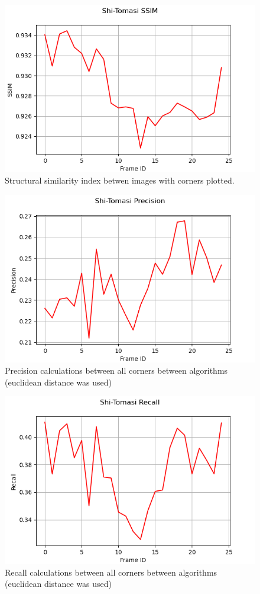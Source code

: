 \documentclass[11pt, conference, letterpaper]{IEEEtran}
\begin{document}
\begin{figure}[t]
    \centering
    \includegraphics[width=0.9\linewidth]{images/stc_ssim.png}
    \caption{Structural similarity index betwen images with corners plotted.}
    \label{fig:stc-ssim}
\end{figure}

\begin{figure}[t]
    \centering
    \includegraphics[width=0.9\linewidth]{images/stc_precision.png}
    \caption{Precision calculations between all corners between algorithms (euclidean distance was used)}
    \label{fig:stc-prec}
\end{figure}

\begin{figure}[t]
    \centering
    \includegraphics[width=0.9\linewidth]{images/stc_recall.png}
    \caption{Recall calculations between all corners between algorithms (euclidean distance was used)}
    \label{fig:stc-rec}
\end{figure}
\end{document}
